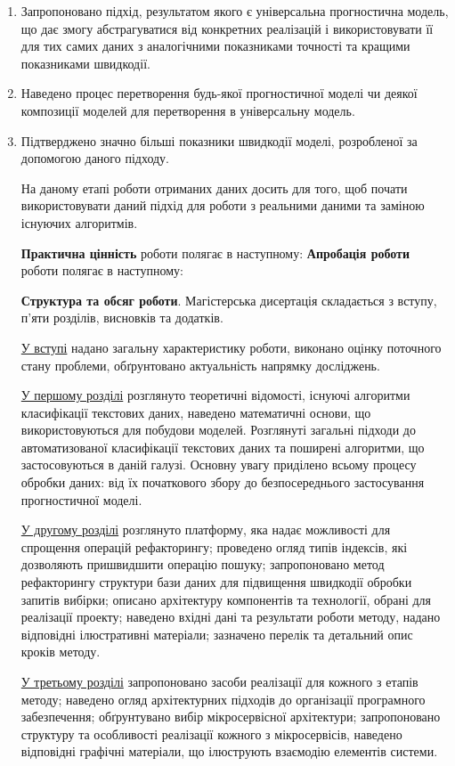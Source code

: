 \documentclass[14pt]{article}
\begin{document}
\begin{enumerate}
	\item Запропоновано підхід, результатом якого є універсальна прогностична модель, що дає змогу абстрагуватися від конкретних реалізацій і використовувати її для тих самих даних з аналогічними показниками точності та кращими показниками швидкодії.
	\item Наведено процес перетворення будь-якої прогностичної моделі чи деякої композиції моделей для перетворення в універсальну модель.
	\item Підтверджено значно більші показники швидкодії моделі, розробленої за допомогою даного підходу.
\begin{enumerate}
На даному етапі роботи отриманих даних досить для того, щоб почати використовувати даний підхід для роботи з реальними даними та заміною існуючих алгоритмів.

\textbf{Практична цінність} роботи полягає в наступному:
\textbf{Апробація роботи} роботи полягає в наступному:

\textbf{Структура та обсяг роботи}. Магістерська дисертація складається з вступу, п'яти розділів, висновків та додатків.

\underline{У вступі} надано загальну характеристику роботи, виконано оцінку поточного стану проблеми, обґрунтовано актуальність напрямку досліджень.

\underline{У першому розділі} розглянуто теоретичні відомості, існуючі алгоритми класифікації текстових даних, наведено математичні основи, що використовуються для побудови моделей. Розглянуті загальні підходи до автоматизованої класифікації текстових даних та поширені алгоритми, що застосовуються в даній галузі. Основну увагу приділено всьому процесу обробки даних: від їх початкового збору до безпосереднього застосування прогностичної моделі.

\underline{У другому розділі} розглянуто платформу, яка надає можливості для спрощення операцій рефакторингу; проведено огляд типів індексів, які дозволяють пришвидшити операцію пошуку; запропоновано метод рефакторингу структури бази даних для підвищення швидкодії обробки запитів вибірки; описано архітектуру компонентів та технології, обрані для реалізації проекту; наведено вхідні дані та результати роботи методу, надано відповідні ілюстративні матеріали; зазначено перелік та детальний опис кроків методу.

\underline{У третьому розділі} запропоновано засоби реалізації для кожного з етапів методу; наведено огляд архітектурних підходів до організації програмного забезпечення; обґрунтувано вибір мікросервісної архітектури; запропоновано структуру та особливості реалізації кожного з мікросервісів, наведено відповідні графічні матеріали, що ілюструють взаємодію елементів системи.


\end{enumerate}
\end{enumerate}
\end{document}
